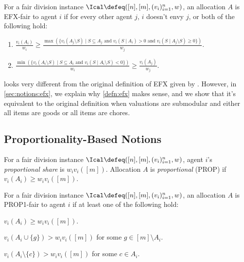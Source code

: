 \begin{definition}
\label{defn:efx}
For a fair division instance $\Ical \defeq ([n], [m], (v_i)_{i=1}^n, w)$,
an allocation $A$ is EFX-fair to agent $i$ if for every other agent $j$,
$i$ doesn't envy $j$, or both of the following hold:
\begin{enumerate}
\item $\displaystyle \frac{v_i(A_i)}{w_i} \ge \frac{\max(\{v_i(A_j \setminus S) \mid S \subseteq A_j
    \textrm{ and } v_i(S \mid A_i) > 0 \textrm{ and } v_i(S \mid A_j \setminus S) \ge 0\})}{w_j}$.
\item $\displaystyle \frac{\min(\{v_i(A_i \setminus S) \mid S \subseteq A_i
    \textrm{ and } v_i(S \mid A_i \setminus S) < 0 \})}{w_i} \ge \frac{v_i(A_j)}{w_j}$.
\end{enumerate}
\end{definition}

 looks very different from the original definition of EFX
given by \cite{caragiannis2019unreasonable}.
However, in \cref{sec:notions:efx}, we explain why \cref{defn:efx} makes sense,
and we show that it's equivalent to the original definition when
valuations are submodular and either all items are goods or all items are chores.

\subsection{Proportionality-Based Notions}

\begin{definition}[PROP]
\label{defn:prop}
For a fair division instance $\Ical \defeq ([n], [m], (v_i)_{i=1}^n, w)$,
agent $i$'s \emph{proportional share} is $w_iv_i([m])$.
Allocation $A$ is \emph{proportional} (PROP) if $v_i(A_i) \ge w_iv_i([m])$.
\end{definition}

\begin{definition}
\label{defn:prop1}
For a fair division instance $\Ical \defeq ([n], [m], (v_i)_{i=1}^n, w)$,
an allocation $A$ is PROP1-fair to agent $i$ if at least one of the following hold:
\begin{tightenum}
\item $v_i(A_i) \ge w_iv_i([m])$.
\item $v_i(A_i \cup \{g\}) > w_iv_i([m])$ for some $g \in [m] \setminus A_i$.
\item $v_i(A_i \setminus \{c\}) > w_iv_i([m])$ for some $c \in A_i$.
\end{tightenum}
\end{definition}


